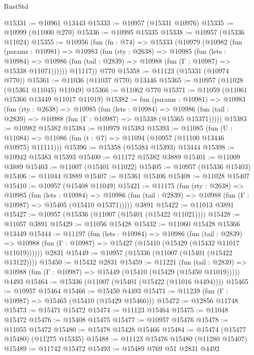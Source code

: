 \begin{lexlean}{RustStd}
\begin{coremodule}
{\begin{coremodule}
{{{{{{{{{{{{{{{{{{{{{{{{{{{{{{{{{@15331 := @10961 @13443
@15333 := @10957 (@15331 @10976)
@15335 := @10999 (@11000 @270)
@15336 := @10995 @15335
@15338 := @10957 (@15336 @11024)
@15355 := @10956
    (fun (fn : @74) =>
    @15333
      (@10979
        (@10982
          (fun (params : @10981) =>
          @10983
            (fun (rty : @2638) =>
            @10985
              (fun (lets : @10984) =>
              @10986 (fun (tail : @2839) => @10988 (fun (Γ : @10987) => @15338 @11071))))))
        @11117))
    @770
@15358 := @11123 (@15331 (@10974 @770))
@15361 := @11036 (@11037 @770) @13446
@15365 := @10957 (@11028 (@15361 @11045) @11049)
@15366 := @11062 @770
@15371 := @11059 (@11061 @15366 @13449 @11017 @11019)
@15382 := fun (params : @10981) =>
  @10983
    (fun (rty : @2638) =>
    @10985
      (fun (lets : @10984) =>
      @10986 (fun (tail : @2839) => @10988 (fun (Γ : @10987) => @15338 (@15365 @15371)))))
@15383 := @10982 @15382
@15384 := @10979 @15383
@15393 := @11085
    (fun (U : @11084) => @11086 (fun (t : @7) => @11094 (@10957 (@11100 @13446 @10975) @11111)))
@15396 := @15358 (@15384 @15393) @13444
@15398 := @10942 @15383 @15393
@15400 := @11172 @15382 @3889
@15401 := @11009 @3889
@15403 := @11007 (@15401 @11022)
@15405 := @10957 (@15336 @15403)
@15406 := @11044 @3889
@15407 := @15361 @15406
@15408 := @11028 @15407
@15410 := @10957 (@15408 @11049)
@15421 := @11175
    (fun (rty : @2638) =>
    @10985
      (fun (lets : @10984) =>
      @10986 (fun (tail : @2839) => @10988 (fun (Γ : @10987) => @15405 (@15410 @15371)))))
    @3891
@15422 := @11013 @3891
@15427 := @10957 (@15336 (@11007 (@15401 (@15422 @11021))))
@15428 := @11057 @3891
@15429 := @11056 @15428
@15432 := @11060 @15428 @15366 @13449
@15444 := @11197
    (fun (lets : @10984) =>
    @10986
      (fun (tail : @2839) =>
      @10988 (fun (Γ : @10987) => @15427 (@15410 (@15429 (@15432 @11017 @11019))))))
    @2831
@15449 := @10957 (@15336 (@11007 (@15401 (@15422 @13122))))
@15450 := @15432 @2831
@15459 := @11221
    (fun (tail : @2839) => @10988 (fun (Γ : @10987) => @15449 (@15410 (@15429 (@15450 @11019)))))
    @4493
@15464 := @15336 (@11007 (@15401 (@15422 (@11016 @4494))))
@15465 := @10957 @15464
@15466 := @15450 @4493
@15471 := @11239 (fun (Γ : @10987) => @15465 (@15410 (@15429 @15466)))
@15472 := @12856 @11748
@15473 := @15471 @15472
@15474 := @11123 @15464
@15475 := @11048 @15472
@15476 := @15408 @15475
@15477 := @10957 @15476
@15478 := @11055 @15472
@15480 := @15478 @15428 @15466
@15484 := @15474 (@15477 @15480) (@11275 @15335)
@15488 := @11123 @15476 @15480 (@11280 @15407)
@15489 := @11742 @15472
@15493 := @15489 @769 @51 @2831 @4492
}}}}}}}}}}}}}}}}}}}}}}}}}}}}}}}}}
\end{coremodule}}
\end{coremodule}
\end{lexlean}
